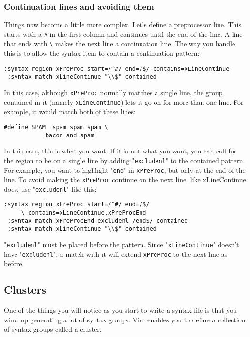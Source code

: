 \subsubsection{Continuation lines and avoiding them}
Things now become a little more complex.
Let's define a preprocessor line.
This starts with a \texttt{\#} in the first column and continues until the end of the line.
A line that ends with \texttt{\textbackslash{}} makes the next line a continuation line.
The way you handle this is to allow the syntax item to contain a continuation pattern:

\begin{Verbatim}[samepage=true]
 :syntax region xPreProc start=/^#/ end=/$/ contains=xLineContinue
 :syntax match xLineContinue "\\$" contained
\end{Verbatim}

In this case, although \texttt{xPreProc} normally matches a single line, the group contained in it (namely \texttt{xLineContinue}) lets it go on for more than one line.
For example, it would match both of these lines:

\begin{Verbatim}[samepage=true]
    #define SPAM  spam spam spam \ 
            bacon and spam 
\end{Verbatim}

In this case, this is what you want.
If it is not what you want, you can call for the region to be on a single line by adding "\texttt{excludenl}" to the contained pattern.
For example, you want to highlight "\texttt{end}" in \texttt{xPreProc}, but only at the end of the line.
To avoid making the \texttt{xPreProc} continue on the next line, like xLineContinue does, use "\texttt{excludenl}" like this:

\begin{Verbatim}[samepage=true]
 :syntax region xPreProc start=/^#/ end=/$/
     \ contains=xLineContinue,xPreProcEnd
 :syntax match xPreProcEnd excludenl /end$/ contained
 :syntax match xLineContinue "\\$" contained
\end{Verbatim}

"\texttt{excludenl}" must be placed before the pattern.
Since "\texttt{xLineContinue}" doesn't have "\texttt{excludenl}", a match with it will extend \texttt{xPreProc} to the next line as before.
\subsection{Clusters}
\label{Clusters}
One of the things you will notice as you start to write a syntax file is that you wind up generating a lot of syntax groups.
Vim enables you to define a collection of syntax groups called a cluster.

